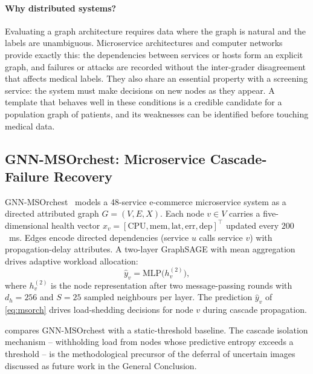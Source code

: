 \paragraph{Why distributed systems?}
Evaluating a graph architecture requires data where the graph is natural and the labels
are unambiguous. Microservice architectures and computer networks provide exactly this:
the dependencies between services or hosts form an explicit graph, and failures or attacks
are recorded without the inter-grader disagreement that affects medical labels. They also
share an essential property with a screening service: the system must make decisions on
new nodes as they appear. A template that behaves well in these conditions is a credible
candidate for a population graph of patients, and its weaknesses can be identified before
touching medical data.

\subsection{GNN-MSOrchest: Microservice Cascade-Failure Recovery}
\label{sec:msorchest}

GNN-MSOrchest~\cite{belhadj2025icaart} models a 48-service e-commerce microservice system
as a directed attributed graph $G=(V,E,X)$. Each node $v\in V$ carries a five-dimensional
health vector $x_v=[\mathrm{CPU},\mathrm{mem},\mathrm{lat},\mathrm{err},\mathrm{dep}]^\top$
updated every $200$~ms. Edges encode directed dependencies (service $u$ calls service
$v$) with propagation-delay attributes. A two-layer GraphSAGE with mean aggregation drives
adaptive workload allocation:
\begin{equation}
\hat y_v = \mathrm{MLP}\bigl(h^{(2)}_v\bigr),
\label{eq:msorch}
\end{equation}
where $h^{(2)}_v$ is the node representation after two message-passing rounds with
$d_h=256$ and $S=25$ sampled neighbours per layer. The prediction $\hat y_v$ of
\cref{eq:msorch} drives load-shedding decisions for node $v$ during cascade propagation.

 compares GNN-MSOrchest with a static-threshold baseline. The cascade
isolation mechanism -- withholding load from nodes whose predictive entropy exceeds a
threshold -- is the methodological precursor of the deferral of uncertain images discussed
as future work in the General Conclusion.

